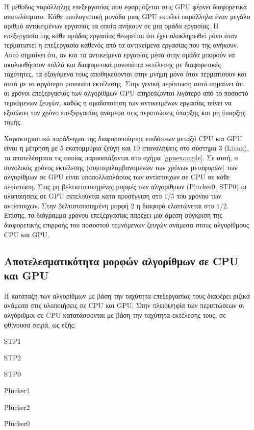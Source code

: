 Η μέθοδος παράλληλης επεξεργασίας που εφαρμόζεται στις GPU φέρνει διαφορετικά αποτελέσματα. Κάθε υπολογιστική μονάδα μιας GPU εκτελεί παράλληλα έναν μεγάλο αριθμό αντικειμένων εργασίας τα οποία ανήκουν σε μια ομάδα εργασίας. Η επεξεργασία της κάθε ομάδας εργασίας θεωρείται ότι έχει ολοκληρωθεί μόνο όταν τερματιστεί η επεξεργασία καθενός από τα αντικείμενα εργασίας που της ανήκουν. Αυτό σημαίνει ότι, αν και τα αντικείμενα εργασίας μέσα στην ομάδα μπορούν να ακολουθήσουν πολλά και διαφορετικά μονοπάτια εκτέλεσης με διαφορετικές ταχύτητες, τα εξαγόμενα τους αποθηκεύονται στην μνήμη μόνο όταν τερματίσουν και αυτά με το αργότερο μονοπάτι εκτέλεσης. Στην γενική περίπτωση αυτό σημαίνει ότι οι χρόνοι επεξεργασίας των αλγορίθμων GPU επηρεάζονται λιγότερο από το ποσοστό τεμνόμενων ζευγών, καθώς η ομαδοποίηση των αντικειμένων εργασίας τείνει να εξισώσει τον χρόνο επεξεργασίας ανάμεσα στις περιπτώσεις ύπαρξης και μη ύπαρξης τομής. 

Χαρακτηριστικό παράδειγμα της διαφοροποίησης επιδόσεων μεταξύ CPU και GPU είναι η μέτρηση με 5 εκατομμύρια ζεύγη και 10 επαναλήψεις στο σύστημα 3 (Linux), τα αποτελέσματα τις οποίας παρουσιάζονται στο σχήμα \ref{gpuexample}. Σε αυτή, ο συνολικός χρόνος εκτέλεσης (συμπεριλαμβανομένων των χρόνων μεταφορών) των αλγορίθμων σε GPU είναι υποπολλαπλάσιος των αντίστοιχων σε CPU σε κάθε περίπτωση. Στις μη βελτιστοποιημένες μορφές των αλγορίθμων (Plucker0, STP0) οι υλοποιήσεις σε GPU εκτελούνται κατα προσέγγιση στο $1/5$ του χρόνου των αντίστοιχων. Στην βελτιστοποιημένη μορφή 2 η διαφορά ελαττώνεται στο $1/2$. Επίσης, το διάγραμμα χρόνου επεξεργασίας παρέχει μια άμεση σύγκριση της διαφορετικής επιρροής του ποσοστού τεμνόμενων ζευγών ανάμεσα στους αλγορίθμους CPU και GPU.

\subsection{Αποτελεσματικότητα μορφών αλγορίθμων σε CPU και GPU}
\label{chapter:bench_algs}
\noindent Η κατάταξη των αλγορίθμων με βάση την ταχύτητα επεξεργασίας τους διαφέρει ριζικά ανάμεσα στις υλοποιήσεις σε CPU και GPU. Στην πλειοψηφία των περιπτώσεων οι αλγόριθμοι σε CPU κατατάσσονται με βάση την ταχύτητα εκτέλεσης τους, σε φθίνουσα σειρά, ως εξής:

\begin{enumerate*}
\item STP1
\item STP2
\item STP0
\item Plücker1
\item Plücker2
\item Plücker0
\end{enumerate*}

